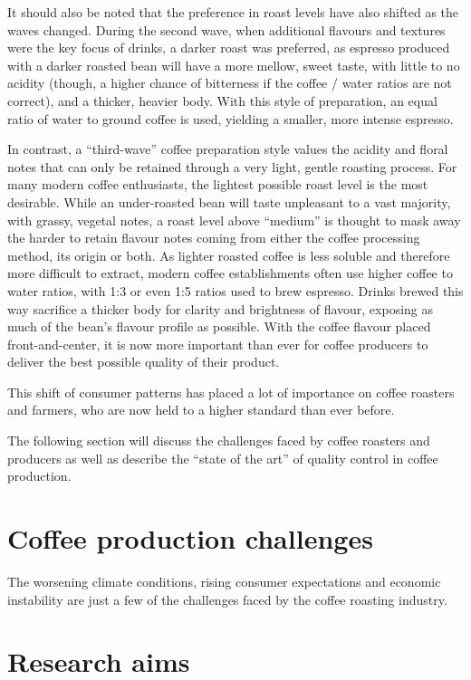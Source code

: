 \documentclass{./styles/UoYCSproject}
\begin{document}
It should also be noted that the preference in roast levels have also shifted as the waves changed.
During the second wave, when additional flavours and textures were the key focus of drinks,
a darker roast was preferred, as espresso produced with a darker roasted bean will have a more mellow,
sweet taste, with little to no acidity (though, a higher chance of bitterness if the coffee / water ratios are not correct),
and a thicker, heavier body.
With this style of preparation, an equal ratio of water to ground coffee is used, yielding a smaller, more intense espresso.

In contrast, a ``third-wave'' coffee preparation style values the acidity and floral notes that can only be retained
through a very light, gentle roasting process.
For many modern coffee enthusiasts, the lightest possible roast level is the most desirable.
While an under-roasted bean will taste unpleasant to a vast majority, with grassy, vegetal notes,
a roast level above ``medium'' is thought to mask away the harder to retain flavour notes
coming from either the coffee processing method, its origin or both.
As lighter roasted coffee is less soluble and therefore more difficult to extract,
modern coffee establishments often use higher coffee to water ratios, with 1:3 or even 1:5 ratios used to brew espresso.
Drinks brewed this way sacrifice a thicker body for clarity and brightness of flavour, exposing as much of the bean's
flavour profile as possible.
With the coffee flavour placed front-and-center, it is now more important than ever for coffee producers to deliver
the best possible quality of their product.

This shift of consumer patterns has placed a lot of importance on coffee roasters and farmers,
who are now held to a higher standard than ever before.

The following section will discuss the challenges faced by coffee roasters and producers
as well as describe the ``state of the art'' of quality control in coffee production.

\section{Coffee production challenges}
\label{sec:coffee-production-challenges}
The worsening climate conditions, rising consumer expectations and economic instability are just a few of the challenges
faced by the coffee roasting industry.

\section{Research aims}
\label{sec:research-aims}
\end{document}
